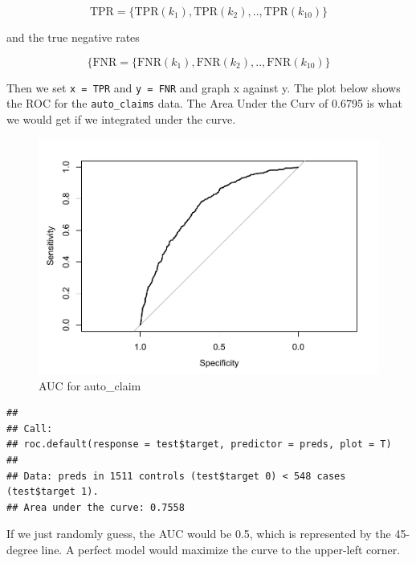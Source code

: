 \documentclass[openany]{book}
\newenvironment{Shaded}{\begin{snugshade}}{\end{snugshade}}
\newcommand{\DataTypeTok}[1]{\textcolor[rgb]{0.13,0.29,0.53}{#1}}
\newcommand{\KeywordTok}[1]{\textcolor[rgb]{0.13,0.29,0.53}{\textbf{#1}}}
\newcommand{\NormalTok}[1]{#1}
\newcommand{\OperatorTok}[1]{\textcolor[rgb]{0.81,0.36,0.00}{\textbf{#1}}}
\begin{document}
\[\text{TPR} = \{\text{TPR}(k_1), \text{TPR}(k_2), .., \text{TPR}(k_{10})\} \]

and the true negative rates

\[\{\text{FNR} = \{\text{FNR}(k_1), \text{FNR}(k_2), .., \text{FNR}(k_{10})\}\]

Then we set \texttt{x\ =\ TPR} and \texttt{y\ =\ FNR} and graph x against y. The plot below shows the ROC for the \texttt{auto\_claims} data. The Area Under the Curv of 0.6795 is what we would get if we integrated under the curve.

\begin{Shaded}
\end{Shaded}

\begin{figure}
\centering
\includegraphics{05-linear-models_files/figure-latex/unnamed-chunk-39-1.pdf}
\caption{\label{fig:unnamed-chunk-39}AUC for auto\_claim}
\end{figure}

\begin{verbatim}
## 
## Call:
## roc.default(response = test$target, predictor = preds, plot = T)
## 
## Data: preds in 1511 controls (test$target 0) < 548 cases (test$target 1).
## Area under the curve: 0.7558
\end{verbatim}

If we just randomly guess, the AUC would be 0.5, which is represented by the 45-degree line. A perfect model would maximize the curve to the upper-left corner.
\end{document}

